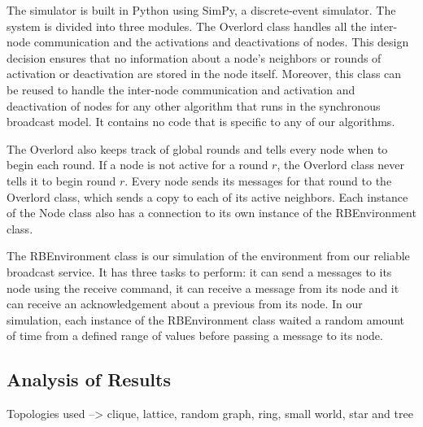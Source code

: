 \documentclass[english]{article}
\begin{document}
The simulator is built in Python using SimPy, a discrete-event simulator. The system is divided into three modules. The Overlord class handles all the inter-node communication and the activations and deactivations of nodes. This design decision ensures that no information about a node's neighbors or rounds of activation or deactivation are stored in the node itself. Moreover, this class can be reused to handle the inter-node communication and activation and deactivation of nodes for any other algorithm that runs in the synchronous broadcast model. It contains no code that is specific to any of our algorithms. 

The Overlord also keeps track of global rounds and tells every node when to begin each round. If a node is not active for a round $r$, the Overlord class never tells it to begin round $r$. Every node sends its messages for that round to the Overlord class, which sends a copy to each of its active neighbors. Each instance of the Node class also has a connection to its own instance of the RBEnvironment class.

The RBEnvironment class is our simulation of the environment from our reliable broadcast service. It has three tasks to perform: it can send a messages to its node using the receive command, it can receive a message from its node and it can receive an acknowledgement about a previous from its node. In our simulation, each instance of the RBEnvironment class waited a random amount of time from a defined range of values before passing a message to its node. 



\subsection{Analysis of Results}

Topologies used --> clique, lattice, random graph, ring, small world, star and tree
\end{document}
